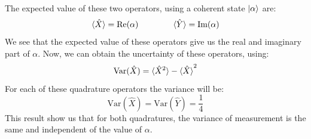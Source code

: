 %
The expected value of these two operators, using a coherent state $\ket{\alpha}$ are:
%
\begin{equation}
\braket{\hat{X}} = \textrm{Re}(\alpha) \qquad \qquad
\braket{\hat{Y}} = \textrm{Im}(\alpha)
\end{equation}
%
We see that the expected value of these operators give us the real and imaginary part of $\alpha$. Now, we can obtain the uncertainty of these operators, using:
%
\begin{equation}
\textrm{Var}(\hat{X}) = \braket{\hat{X}^2} - \braket{\hat{X}}^2
\end{equation}
%
For each of these quadrature operators the variance will be:
%
\begin{equation}
\textrm{Var}(\hat{X}) = \textrm{Var}(\hat{Y}) = \frac{1}{4}
\end{equation}
%
This result show us that for both quadratures, the variance of measurement is the same and independent of the value of $\alpha$.
%
%
%
